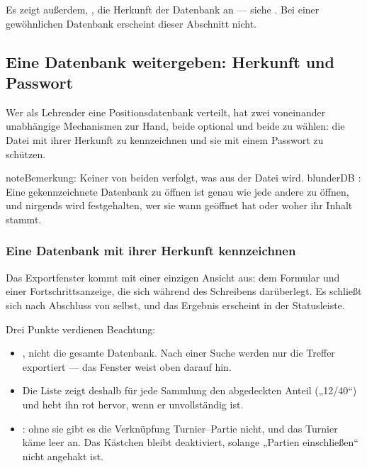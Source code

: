 \documentclass[letterpaper,10pt,german]{sphinxmanual}
\begin{document}
\sphinxAtStartPar
Es zeigt außerdem, , die Herkunft der Datenbank an — siehe {\hyperref[\detokenize{manuel:diffusion-controlee}]{}}. Bei einer gewöhnlichen Datenbank erscheint dieser Abschnitt nicht.


\subsection{Eine Datenbank weitergeben: Herkunft und Passwort}
\label{\detokenize{manuel:diffuser-une-base-origine-et-mot-de-passe}}\label{\detokenize{manuel:diffusion-controlee}}
\sphinxAtStartPar
Wer als Lehrender eine Positionsdatenbank verteilt, hat zwei voneinander unabhängige Mechanismen zur Hand, beide optional und beide  zu wählen: die Datei mit ihrer Herkunft zu kennzeichnen und sie mit einem Passwort zu schützen.

\begin{sphinxadmonition}{note}{Bemerkung:}
\sphinxAtStartPar
Keiner von beiden verfolgt, was aus der Datei wird. blunderDB : Eine gekennzeichnete Datenbank zu öffnen ist genau wie jede andere zu öffnen, und nirgends wird festgehalten, wer sie wann geöffnet hat oder woher ihr Inhalt stammt.
\end{sphinxadmonition}


\subsubsection{Eine Datenbank mit ihrer Herkunft kennzeichnen}
\label{\detokenize{manuel:marquer-une-base-de-son-origine}}
\sphinxAtStartPar
Das Exportfenster kommt mit einer einzigen Ansicht aus: dem Formular und einer Fortschrittsanzeige, die sich während des Schreibens darüberlegt. Es schließt sich nach Abschluss von selbst, und das Ergebnis erscheint in der Statusleiste.

\sphinxAtStartPar
Drei Punkte verdienen Beachtung:
\begin{itemize}
\item {} 
\sphinxAtStartPar
{}, nicht die gesamte Datenbank. Nach einer Suche werden nur die Treffer exportiert — das Fenster weist oben darauf hin.

\item {} 
\sphinxAtStartPar
{} Die Liste zeigt deshalb für jede Sammlung den abgedeckten Anteil („12/40“) und hebt ihn rot hervor, wenn er unvollständig ist.

\item {} 
\sphinxAtStartPar
{}: ohne sie gibt es die Verknüpfung Turnier–Partie nicht, und das Turnier käme leer an. Das Kästchen bleibt deaktiviert, solange „Partien einschließen“ nicht angehakt ist.

\end{itemize}
\end{document}
